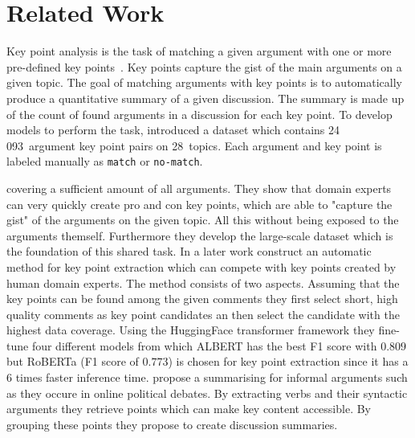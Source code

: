 \section{Related Work}\label{related-work}


Key point analysis is the task of matching a given argument with one or more pre-defined key points~\cite{Bar-HaimEFKLS2020}. Key points capture the gist of the main arguments on a given topic. The goal of matching arguments with key points is to automatically produce a quantitative summary of a given discussion. The summary is made up of the count of found arguments in a discussion for each key point. To develop models to perform the task, \citet{Bar-HaimEFKLS2020} introduced a dataset \ArgKP which contains 24 093~argument key point pairs on 28~topics. Each argument and key point is labeled manually as \texttt{match} or \texttt{no-match}.


covering a sufficient amount of all arguments. They show that domain experts can very quickly
create pro and con key points, which are able to "capture the gist" of the arguments on the given topic. All this
without being exposed to the arguments themself. Furthermore they develop the large-scale dataset 
which is the foundation of this shared task. 
In a later work \citet{Bar-HaimKEFLS2020} construct an automatic method for key point 
extraction which can compete with key points created by human domain experts. The method consists of two aspects. 
Assuming that the key points can be found among the given comments 
they first select short, high quality comments as key point candidates an then select the candidate with the highest
data coverage. Using the HuggingFace transformer framework they fine-tune four different models from which 
ALBERT \cite{lan2019albert} has the best F1 score with $0.809$ but RoBERTa \cite{LiuOGDJCLLZS2019} (F1 score of 
$0.773$) is chosen for key point extraction since it has a 6 times faster inference time. 
\citet{egan2016summarising} propose a summarising for informal arguments such as they
occure in online political debates. By extracting verbs and their syntactic arguments they retrieve points which
can make key content accessible. By grouping these points they propose to create discussion summaries.

